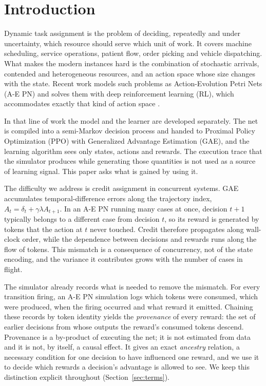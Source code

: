 \documentclass[review,authoryear,3p,times]{elsarticle}
\begin{document}
\section{Introduction}

Dynamic task assignment is the problem of deciding, repeatedly and under
uncertainty, which resource should serve which unit of work. It covers machine
scheduling, service operations, patient flow, order picking and vehicle
dispatching. What makes the modern instances hard is the combination of
stochastic arrivals, contended and heterogeneous resources, and an action space
whose size changes with the state. Recent work models such problems as
Action-Evolution Petri Nets (A-E PN) and solves them with deep reinforcement
learning (RL), which accommodates exactly that kind of action space
\citep{aepn2023,aepn_repr2025,gympn2025}.

In that line of work the model and the learner are developed separately. The
net is compiled into a semi-Markov decision process and handed to Proximal
Policy Optimization (PPO) with Generalized Advantage Estimation (GAE), and the
learning algorithm sees only states, actions and rewards. The execution trace
that the simulator produces while generating those quantities is not used as a
source of learning signal. This paper asks what is gained by using it.

The difficulty we address is credit assignment in concurrent systems. GAE
accumulates temporal-difference errors along the trajectory index,
$A_t = \delta_t + \gamma\lambda A_{t+1}$. In an A-E PN running many cases at
once, decision $t+1$ typically belongs to a different case from decision $t$,
so its reward is generated by tokens that the action at $t$ never touched.
Credit therefore propagates along wall-clock order, while the dependence
between decisions and rewards runs along the flow of tokens. This mismatch is
a consequence of concurrency, not of the state encoding, and the variance it
contributes grows with the number of cases in flight.

The simulator already records what is needed to remove the mismatch. For every
transition firing, an A-E PN simulation logs which tokens were consumed, which
were produced, when the firing occurred and what reward it emitted. Chaining
these records by token identity yields the \emph{provenance} of every reward:
the set of earlier decisions from whose outputs the reward's consumed tokens
descend. Provenance is a by-product of executing the net; it is not estimated
from data and it is not, by itself, a causal effect. It gives an exact
\emph{ancestry} relation, a necessary condition for one decision to have
influenced one reward, and we use it to decide which rewards a decision's
advantage is allowed to see. We keep this distinction explicit throughout
(Section~\ref{sec:terms}).
\end{document}
